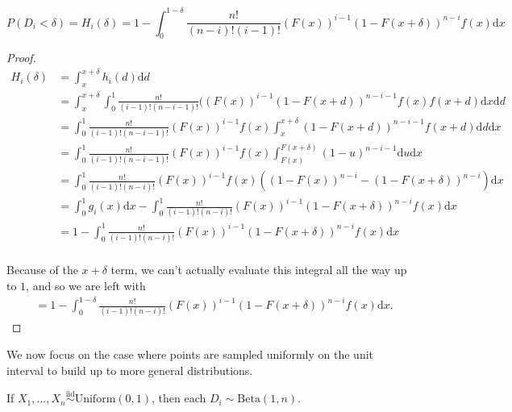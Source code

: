 \documentclass[12pt]{article}
\begin{document}
\begin{lemma}

\begin{equation}
\label{eq:cdf}
P(D_i < \delta) = H_i(\delta) = 1 - \int_0^{1-\delta} \frac{n!}{(n-i)! (i-1)!} (F(x))^{i-1} (1 - F(x + \delta))^{n-i} f(x) \mathrm{d}x
\end{equation}
\end{lemma}

\begin{proof}
$$
\begin{aligned}
H_i(\delta) & = \int_x^{x+\delta} h_i(d) \mathrm{d}d \\
& = \int_x^{x+\delta} \int_0^{1} \frac{n!}{(i-1)! (n-i-1)!} ((F(x))^{i-1} (1 - F(x+d))^{n-i-1} f(x) f(x+d) \mathrm{d}x \mathrm{d}d \\
& = \int_0^{1} \frac{n!}{(i-1)! (n-i-1)!} (F(x))^{i-1} f(x) \int_x^{x+\delta} (1 - F(x+d))^{n-i-1} f(x+d) \mathrm{d}d \mathrm{d}x \\
& = \int_0^{1} \frac{n!}{(i-1)! (n-i-1)!} (F(x))^{i-1} f(x) \int_{F(x)}^{F(x+\delta)} (1 - u)^{n-i-1} \mathrm{d}u \mathrm{d}x \\
& = \int_0^{1} \frac{n!}{(i-1)! (n-i)!} (F(x))^{i-1} f(x) ((1 - F(x))^{n-i} - (1 - F(x + \delta))^{n-i}) \mathrm{d}x \\ 
& = \int_0^1 g_i(x) \mathrm{d}x - \int_0^1 \frac{n!}{(i-1)! (n-i)!} (F(x))^{i-1} (1 - F(x + \delta))^{n-i} f(x) \mathrm{d}x \\
& = 1 - \int_0^1 \frac{n!}{(i-1)! (n-i)!} (F(x))^{i-1} (1 - F(x + \delta))^{n-i} f(x) \mathrm{d}x \\
\end{aligned}
$$

Because of the $x + \delta$ term, we can't actually evaluate this integral all the way up to $1$, and so we are left with 
$$
\begin{aligned}
& = 1 - \int_0^{1 - \delta} \frac{n!}{(i-1)! (n-i)!} (F(x))^{i-1} (1 - F(x + \delta))^{n-i} f(x) \mathrm{d}x.
\end{aligned}
$$
\end{proof}

We now focus on the case where points are sampled uniformly on the unit
interval to build up to more general distributions.

\begin{lemma}
If $X_1, ..., X_n \stackrel{\mathrm{iid}}{\sim}\mathrm{Uniform}(0, 1)$, then each $D_i \sim \mathrm{Beta}(1, n)$.
\end{lemma}
\end{document}
